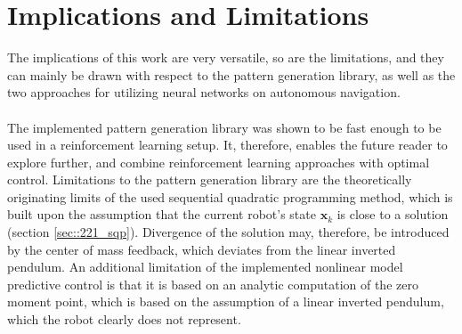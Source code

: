 \section{Implications and Limitations}
The implications of this work are very versatile, so are the limitations, and they can mainly be drawn with respect to the pattern generation library, as well as the two approaches for utilizing neural networks on autonomous navigation.\\\\
The implemented pattern generation library was shown to be fast enough to be used in a reinforcement learning setup. It, therefore, enables the future reader to explore further, and combine reinforcement learning approaches with optimal control. Limitations to the pattern generation library are the theoretically originating limits of the used sequential quadratic programming method, which is built upon the assumption that the current robot's state $\bm{x}_k$ is close to a solution (section \ref{sec::221_sqp}). Divergence of the solution may, therefore, be introduced by the center of mass feedback, which deviates from the linear inverted pendulum. An additional limitation of the implemented nonlinear model predictive control is that it is based on an analytic computation of the zero moment point, which is based on the assumption of a linear inverted pendulum, which the robot clearly does not represent.\\\\
